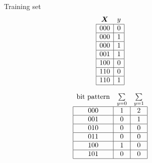\begin{figure}[!htb]
\small
\begin{minipage}{.95\linewidth}\centering
  \begin{minipage}[b]{.2\linewidth}\centering
    Training set
    \begin{align*}
      \begin{array}{cc}
        \bm{X}                         & y                      \\ \hline
        \multicolumn{1}{|c|}{000} & \multicolumn{1}{c|}{0} \\ \hline
        \multicolumn{1}{|c|}{000} & \multicolumn{1}{c|}{1} \\ \hline
        \multicolumn{1}{|c|}{000} & \multicolumn{1}{c|}{1} \\ \hline
        \multicolumn{1}{|c|}{001} & \multicolumn{1}{c|}{1} \\ \hline
        \multicolumn{1}{|c|}{100} & \multicolumn{1}{c|}{0} \\ \hline
        \multicolumn{1}{|c|}{110} & \multicolumn{1}{c|}{0} \\ \hline
        \multicolumn{1}{|c|}{110} & \multicolumn{1}{c|}{1} \\ \hline
      \end{array}
    \end{align*}
  \end{minipage}
  \begin{minipage}[b]{.4\linewidth}\centering
    \begin{align*}
      \begin{array}{ccc}
        \text{bit pattern}        & \sum\limits_{y=0}      & \multicolumn{1}{l}{\sum\limits_{y=1}} \\ \hline
        \multicolumn{1}{|c|}{000} & \multicolumn{1}{c|}{1} & \multicolumn{1}{c|}{2}                \\ \hline
        \multicolumn{1}{|c|}{001} & \multicolumn{1}{c|}{0} & \multicolumn{1}{c|}{1}                \\ \hline
        \multicolumn{1}{|c|}{010} & \multicolumn{1}{c|}{0} & \multicolumn{1}{c|}{0}                \\ \hline
        \multicolumn{1}{|c|}{011} & \multicolumn{1}{c|}{0} & \multicolumn{1}{c|}{0}                \\ \hline
        \multicolumn{1}{|c|}{100} & \multicolumn{1}{c|}{1} & \multicolumn{1}{c|}{0}                \\ \hline
        \multicolumn{1}{|c|}{101} & \multicolumn{1}{c|}{0} & \multicolumn{1}{c|}{0}                \\ \hline

\end{array}
\end{align*}
\end{minipage}
\end{minipage}
\end{figure}

